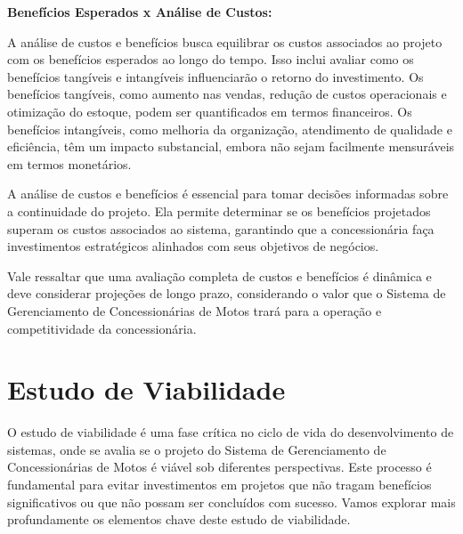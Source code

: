 \textbf{Benefícios Esperados x Análise de Custos:}

A análise de custos e benefícios busca equilibrar os custos associados ao projeto com os benefícios esperados ao longo do tempo. Isso inclui avaliar como os benefícios tangíveis e intangíveis influenciarão o retorno do investimento. Os benefícios tangíveis, como aumento nas vendas, redução de custos operacionais e otimização do estoque, podem ser quantificados em termos financeiros. Os benefícios intangíveis, como melhoria da organização, atendimento de qualidade e eficiência, têm um impacto substancial, embora não sejam facilmente mensuráveis em termos monetários.

A análise de custos e benefícios é essencial para tomar decisões informadas sobre a continuidade do projeto. Ela permite determinar se os benefícios projetados superam os custos associados ao sistema, garantindo que a concessionária faça investimentos estratégicos alinhados com seus objetivos de negócios.

Vale ressaltar que uma avaliação completa de custos e benefícios é dinâmica e deve considerar projeções de longo prazo, considerando o valor que o Sistema de Gerenciamento de Concessionárias de Motos trará para a operação e competitividade da concessionária.

\section{Estudo de Viabilidade}
O estudo de viabilidade é uma fase crítica no ciclo de vida do desenvolvimento de sistemas, onde se avalia se o projeto do Sistema de Gerenciamento de Concessionárias de Motos é viável sob diferentes perspectivas. Este processo é fundamental para evitar investimentos em projetos que não tragam benefícios significativos ou que não possam ser concluídos com sucesso. Vamos explorar mais profundamente os elementos chave deste estudo de viabilidade.

